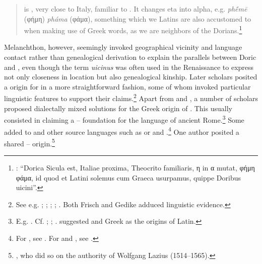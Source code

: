 \begin{quote}
 is , very close to Italy, familiar to . It changes eta into alpha, e.g. \textit{phḗmē} (φήμη) \textit{pháma} (φάμα), something which we Latins are also accustomed to when making use of Greek words, as we are neighbors of the Dorians.\footnote{\citet[a.i\textsc{\textsuperscript{v}}]{Melanchthon1518}: “Dorica Sicula est, Italiae proxima, Theocrito familiaris, η in α mutat, φήμη φάμα, id quod et Latini solemus cum Graeca usurpamus, quippe Doribus uicini”.}
\end{quote}

\hspace*{-0.36703pt}Melanchthon, however, seemingly invoked geographical vicinity and language contact rather than genealogical derivation to explain the parallels between Dor\-ic and , even though the term \textit{uicinus} was often used in the Renaissance to express not only closeness in location but also genealogical kinship. Later scholars posited a  origin for  in a more straightforward fashion, some of whom invoked particular linguistic features to support their claims.\footnote{See e.g. \citet[10]{Sylvius1531}; \citet[\textsc{i.}14]{Estienne1572}; \citet[208]{Merula1605}; \citet[1191]{[frisch]1730}; \citet[20--21]{Gedike1782}. Both Frisch and Gedike adduced linguistic evidence.} Apart from  and , a number of scholars proposed dialectally mixed solutions for the Greek origin of . This usually consisted in claiming a – foundation for the language of ancient Rome.\footnote{E.g. \citet[11--12]{Anon.1613}. Cf. \citet[304--305]{Verwey1684}; \citet[a.2\textsc{\textsuperscript{v}}, 159]{Maittaire1706}; \citet[161]{Gesner1774}. \citet[270, 379]{Casaubon1650} suggested  and  Greek as the origins of Latin.} Some added to  and  other source languages such as  or  and .\footnote{For , see \citet[a.4\textsc{\textsuperscript{r}}]{Canini1555}. For  and , see \citet[39]{Rudiger1782}.} One author posited a shared – origin.\footnote{\citet[13]{Nicolson1715}, who did so on the authority of Wolfgang Lazius (1514–1565).}

